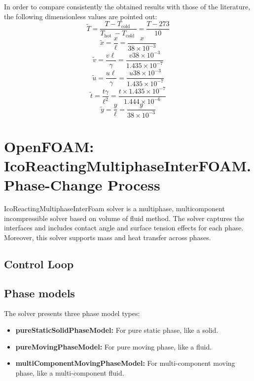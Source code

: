 In order to compare consistently the obtained results with those of the literature, the following dimensionless values are pointed out:
\begin{equation}
	\tilde{T}=\frac{T-T_{\text {cold }}}{T_{\text {hot }}-T_{\text {cold }}}=\frac{T-273}{10}
	\label{}
\end{equation}
\begin{equation}
	\tilde{x}=\frac{x}{\ell}=\frac{x}{38 \times 10^{-3}}
	\label{}
\end{equation}
\begin{equation}
	\tilde{v}=\frac{v \ell}{\gamma}=\frac{v 38 \times 10^{-3}}{1.435 \times 10^{-7}}
	\label{}
\end{equation}
\begin{equation}
	\tilde{u}=\frac{u \ell}{\gamma}=\frac{u 38 \times 10^{-3}}{1.435 \times 10^{-7}}
	\label{}
\end{equation}
\begin{equation}
	\tilde{t}=\frac{t \gamma}{\ell^{2}}=\frac{t \times 1.435 \times 10^{-7}}{1.444 \times 10^{-6}}
	\label{}
\end{equation}
\begin{equation}
	\tilde{y}=\frac{y}{\ell}=\frac{y}{38 \times 10^{-3}}
	\label{}
\end{equation}
\newpage
\section{OpenFOAM: IcoReactingMultiphaseInterFOAM. Phase-Change Process}
IcoReactingMultiphaseInterFoam solver is a multiphase, multicomponent incompressible solver based on volume of fluid method. The solver captures the interfaces and includes contact angle and surface tension effects for each phase. Moreover, this solver supports mass and heat transfer across phases.
\newline
\subsection{Control Loop}

\subsection{Phase models}
The solver presents three phase model types:
\begin{itemize}
	\item \textbf{pureStaticSolidPhaseModel:} For pure static phase, like a solid.
	\item \textbf{pureMovingPhaseModel:} For pure moving phase, like a fluid.
	\item \textbf{multiComponentMovingPhaseModel:} For multi-component moving phase, like a multi-component fluid.
\end{itemize}
